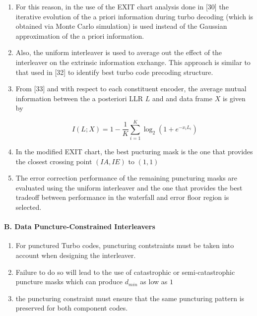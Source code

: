 \documentclass[fontsize=12pt]{article}
\begin{document}
\begin{enumerate}
\begin{enumerate}
\item For this reason, in the use of the EXIT chart analysis done in [30] the iterative evolution of the a priori information during turbo decoding (which is obtained via Monte Carlo simulation) is used instead of the Gaussian approximation of the a priori information.

\item Also, the uniform interleaver is used to average out the effect of the interleaver on the extrinsic information exchange. This approach is similar to that used in [32] to identify best turbo code precoding structure.

\item From [33] and with respect to each constituent encoder, the average mutual information  between the a posteriori LLR $L$ and and data frame $X$ is given by

$$I(L ; X)=1-\frac{1}{K} \sum_{i=1}^{K} \log _{2}\left(1+e^{-x_{i} L_{i}}\right)$$

\item In the modified EXIT chart, the best pucturing mask is the one that provides the closest crossing point $(IA,IE)$ to $(1,1)$

\item The error correction performance of the remaining puncturing masks are evaluated using the uniform interleaver and the one that provides the best tradeoff between performance in the waterfall and error floor region is selected.
\end{enumerate}

\end{enumerate}

\paragraph{B. Data Puncture-Constrained Interleavers}
\begin{enumerate}
\item For punctured Turbo codes, puncturing contstraints must be taken into account when designing the interleaver.

\item Failure to do so will lead to the use of catastrophic or semi-catastrophic puncture masks which can produce $d_{min}$ as low as $1$

\item the puncturing constraint must ensure that the same puncturing pattern is preserved for both component codes.
\end{enumerate}
\end{document}
